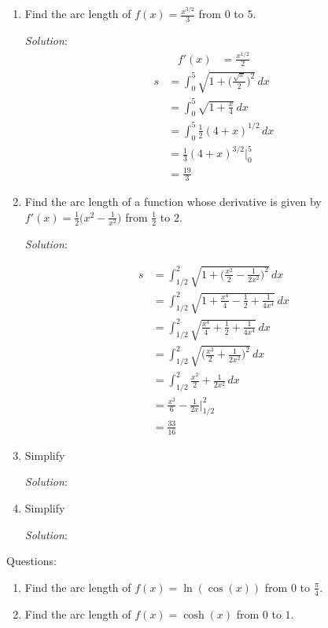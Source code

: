 \documentclass[16pt]{article}
\theoremstyle{remark}
\begin{document}
\begin{enumerate}
\item Find the arc length of $\displaystyle{f(x) = \frac{x^{3/2}}{3}}$ from $0$ to $5$.
\begin{mdframed}[style=TheoremFrame]
\textit{Solution}:
\begin{align*}
f'(x) &= \frac{x^{1/2}}{2}
\end{align*}
\begin{align*}
s &= \int_0^5 \sqrt{1 + \bigg(\frac{\sqrt{x}}{2}\bigg)^2}\, dx\\
&= \int_0^5 \sqrt{1 + \frac{x}{4}}\, dx\\
&= \int_0^5 \frac{1}{2}(4+x)^{1/2} \, dx\\
&= \frac{1}{3} (4+x)^{3/2} \bigg|_0^5 \\
&= \frac{19}{3}
\end{align*}
\end{mdframed}
\newpage
\item Find the arc length of a function whose derivative is given by $\displaystyle{f'(x) = \frac{1}{2}\bigg(x^2 - \frac{1}{x^2}\bigg)}$ from $\displaystyle{\frac{1}{2}}$ to $2$.
\begin{mdframed}[style=TheoremFrame]
\textit{Solution}:

\begin{align*}
s &= \int_{1/2}^2 \sqrt{1+\bigg(\frac{x^2}{2}-\frac{1}{2x^2}\bigg)^2}\, dx\\
&= \int_{1/2}^2 \sqrt{1+\frac{x^4}{4}-\frac{1}{2}+\frac{1}{4x^4}}\, dx\\
&= \int_{1/2}^2 \sqrt{\frac{x^4}{4}+\frac{1}{2}+\frac{1}{4x^4}}\, dx\\
&= \int_{1/2}^2 \sqrt{\bigg(\frac{x^2}{2}+\frac{1}{2x^2}\bigg)^2}\, dx\\
&= \int_{1/2}^2 \frac{x^2}{2}+\frac{1}{2x^2} \, dx\\
&= \frac{x^3}{6}-\frac{1}{2x} \bigg|_{1/2}^2\\
&= \frac{33}{16}
\end{align*}
\end{mdframed}

\item Simplify
\begin{mdframed}[style=TheoremFrame]
\textit{Solution}:\\


\end{mdframed}

\item Simplify
\begin{mdframed}[style=TheoremFrame]
\textit{Solution}:\\


\end{mdframed}
\end{enumerate}

Questions:
\begin{enumerate}
\item Find the arc length of $f(x) = \ln(\cos(x))$ from $0$ to $\displaystyle{\frac{\pi}{4}}$.
\vspace{10cm}
\item Find the arc length of $f(x) = \cosh(x)$ from $0$ to $1$.
\vspace{4cm}
\end{enumerate}
\end{document}
